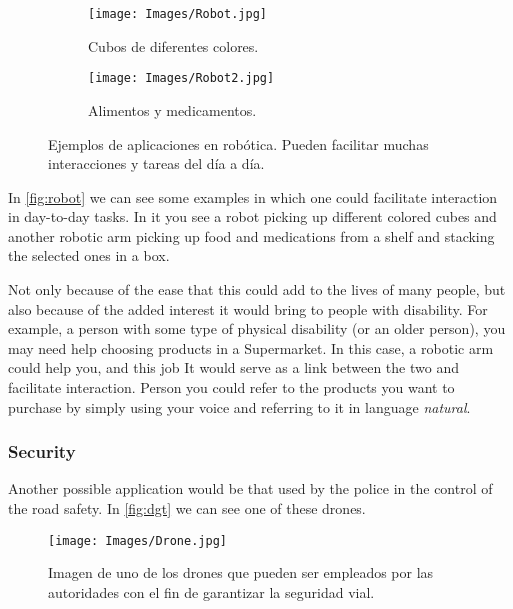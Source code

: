\begin{figure}[ht]
  \centering
  \begin{subfigure}[t]{.55\textwidth}
    \centering
    \caption{Cubos de diferentes colores.}
    \texttt{[image: Images/Robot.jpg]}
  \end{subfigure}\hfill
  \begin{subfigure}[t]{.4\textwidth}
    \centering
    \caption{Alimentos y medicamentos.}
    \texttt{[image: Images/Robot2.jpg]}
  \end{subfigure}
  \caption[Ejemplos de aplicaciones en robótica]{Ejemplos de aplicaciones en
    robótica. Pueden facilitar muchas interacciones y tareas del día a día.}
  \label{fig:robot}
\end{figure}

In \vref{fig:robot} we can see some examples in which one could
facilitate interaction in day-to-day tasks. In it you see a robot
picking up different colored cubes and another robotic arm picking up food and
medications from a shelf and stacking the selected ones in a box.

Not only because of the ease that this could add to the lives of many
people, but also because of the added interest it would bring to people with
disability. For example, a person with some type of physical disability (or
an older person), you may need help choosing products in a
Supermarket. In this case, a robotic arm could help you, and this job
It would serve as a link between the two and facilitate interaction. Person
you could refer to the products you want to purchase by simply using your voice and
referring to it in language \emph{natural}.

\subsubsection{Security}
Another possible application would be that used by the police in the control of the
road safety. In \vref{fig:dgt} we can see one of these
drones.

\begin{figure}[ht]
  \centering
  \texttt{[image: Images/Drone.jpg]}
  \caption[Drones empleados para la seguridad vial]{Imagen de uno de los drones
    que pueden ser empleados por las autoridades con el fin de garantizar la
    seguridad vial.}
  \label{fig:dgt}
\end{figure}

